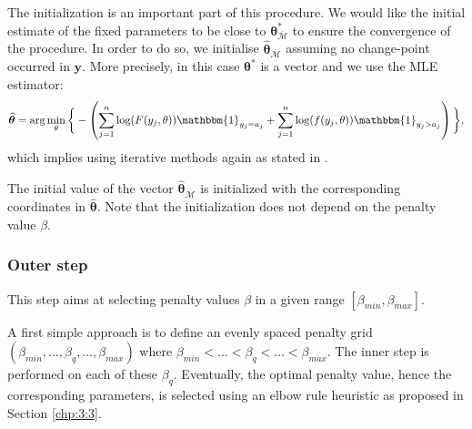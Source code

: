 The initialization is an important part of this procedure. We would like the initial estimate of the fixed parameters to be close to $\bm\theta^*_{{\overline{\mathcal{M}}}}$ to ensure the convergence of the procedure. In order to do so, we initialise $\widehat{\bm\theta}_{\overline{\mathcal{M}}}$ assuming no change-point occurred in $\bm y$.  More precisely, in this case $\bm\theta^*$ is a vector and we use the MLE estimator:  
\begin{equation}\label{chp:4:init}
\widehat{\bm\theta} = \arg\min_{\theta}\bigg\{ - \left(\sum_{j=1}^{n}\log(F(y_j,\theta))\mathbbm{1}_{y_j=a_j}+\sum_{j=1}^{n}\log(f(y_j,\theta))\mathbbm{1}_{y_j>a_j}\right)\bigg\},
\end{equation}   
which implies using iterative methods again as stated in \cite{cohen1965maximum}.

The initial value of the vector $\widehat{\bm\theta}_{\overline{\mathcal{M}}}$ is initialized with the corresponding coordinates in $\widehat{\bm\theta}$. Note that the initialization does not depend on the penalty value $\beta$. 


\subsubsection{Outer step}\label{chp:4:3:2:2}

This step aims at selecting penalty values $\beta$ in a given range $[\beta_{min},\beta_{max}]$.

A first simple approach is to define an evenly spaced penalty grid $(\beta_{min},\dots,\beta_q,\dots,\beta_{max})$ where $\beta_{min}<\dots<\beta_{q}<\dots<\beta_{max}$. The inner step is performed on each of these $\beta_{q}$. Eventually, the optimal penalty value, hence the corresponding parameters, is selected using an elbow rule heuristic as proposed in Section \ref{chp:3:3}.

